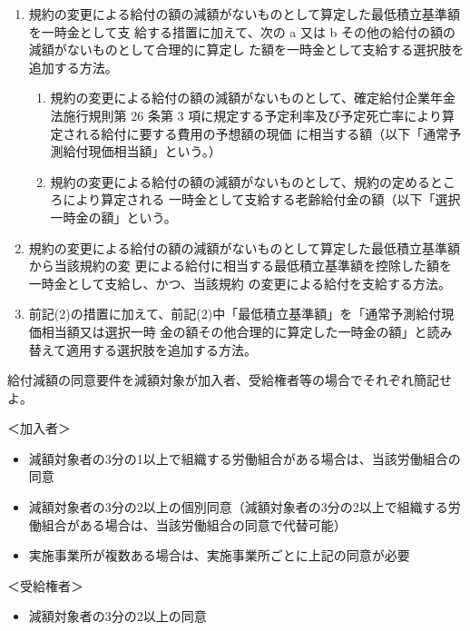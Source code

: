 \begin{answerbox}
  \begin{enumerate}[(1)]
    \item 規約の変更による給付の額の減額がないものとして算定した最低積立基準額を一時金として支
給する措置に加えて、次の a 又は b その他の給付の額の減額がないものとして合理的に算定し
た額を一時金として支給する選択肢を追加する方法。
    \begin{enumerate}[a]
      \item 規約の変更による給付の額の減額がないものとして、確定給付企業年金法施行規則第 26 条第
3 項に規定する予定利率及び予定死亡率により算定される給付に要する費用の予想額の現価
に相当する額（以下「通常予測給付現価相当額」という。）
      \item 規約の変更による給付の額の減額がないものとして、規約の定めるところにより算定される
一時金として支給する老齢給付金の額（以下「選択一時金の額」という。
    \end{enumerate}
    \item 規約の変更による給付の額の減額がないものとして算定した最低積立基準額から当該規約の変
更による給付に相当する最低積立基準額を控除した額を一時金として支給し、かつ、当該規約
の変更による給付を支給する方法。
    \item 前記(2)の措置に加えて、前記(2)中「最低積立基準額」を「通常予測給付現価相当額又は選択一時
金の額その他合理的に算定した一時金の額」と読み替えて適用する選択肢を追加する方法。
  \end{enumerate}
\end{answerbox}

\begin{shortanswer}
  給付減額の同意要件を減額対象が加入者、受給権者等の場合でそれぞれ簡記せよ。
\end{shortanswer}

\begin{answerbox}
  ＜加入者＞

  \begin{itemize}
    \item 減額対象者の3分の1以上で組織する労働組合がある場合は、当該労働組合の同意
    \item 減額対象者の3分の2以上の個別同意（減額対象者の3分の2以上で組織する労働組合がある場合は、当該労働組合の同意で代替可能）
    \item 実施事業所が複数ある場合は、実施事業所ごとに上記の同意が必要
  \end{itemize}
  
  ＜受給権者＞

  \begin{itemize}
    \item 減額対象者の3分の2以上の同意
  \end{itemize}
\end{answerbox}

